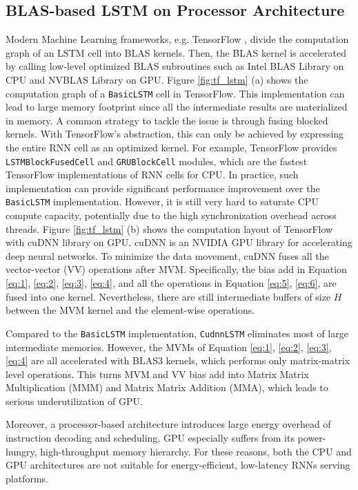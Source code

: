 \subsection{BLAS-based LSTM on Processor Architecture}
Modern Machine Learning frameworks, e.g.
  TensorFlow \cite{abadi2016tensorflow},
  divide the computation graph of an LSTM cell into BLAS kernels.
Then, the BLAS kernel is accelerated by calling low-level
optimized BLAS subroutines such as Intel BLAS Library on CPU
and NVBLAS Library on GPU.
Figure \ref{fig:tf_lstm} (a) shows the computation graph of a \texttt{BasicLSTM} cell in TensorFlow.
This implementation can lead to large memory footprint since all the intermediate results are
  materialized in memory.
A common strategy to tackle the issue is through fusing blocked kernels.
With TensorFlow's abstraction, this can only be achieved by
  expressing the entire RNN cell as an optimized kernel.
For example, TensorFlow provides \texttt{LSTMBlockFusedCell} and \texttt{GRUBlockCell} modules,
  which are the fastest TensorFlow implementations of RNN cells for CPU.
In practice, such implementation can provide significant performance improvement
  over the \texttt{BasicLSTM} implementation.
However, it is still very hard to saturate CPU compute capacity, potentially
due to the high synchronization overhead across threads.
Figure \ref{fig:tf_lstm} (b) shows the computation layout of TensorFlow with
cuDNN library \cite{chetlur2014cudnn} on GPU. cuDNN is an NVIDIA GPU
library for accelerating deep neural networks.
To minimize the data movement,
  cuDNN fuses all the vector-vector (VV) operations after MVM. Specifically, the bias add in
  Equation \ref{eq:1}, \ref{eq:2}, \ref{eq:3}, \ref{eq:4},
  and all the operations in Equation \ref{eq:5}, \ref{eq:6},
  are fused into one kernel.
Nevertheless, there are still intermediate buffers of size $H$
  between the MVM kernel and the element-wise operations.

Compared to the \texttt{BasicLSTM} implementation,
  \texttt{CudnnLSTM} eliminates most of large intermediate memories.
However, the MVMs of Equation \ref{eq:1}, \ref{eq:2}, \ref{eq:3}, \ref{eq:4} are all accelerated
with BLAS3 kernels, which performs only matrix-matrix level operations.
This turns MVM and VV bias add into Matrix Matrix Multiplication (MMM) and Matrix Matrix
Addition (MMA), which leads to serious underutilization of GPU.

Moreover, a processor-based architecture introduces large energy overhead of instruction
  decoding and scheduling.
GPU especially suffers from its power-hungry, high-throughput memory hierarchy.
For these reasons, both the CPU and GPU architectures are not suitable
  for energy-efficient, low-latency RNNs serving platforms.

